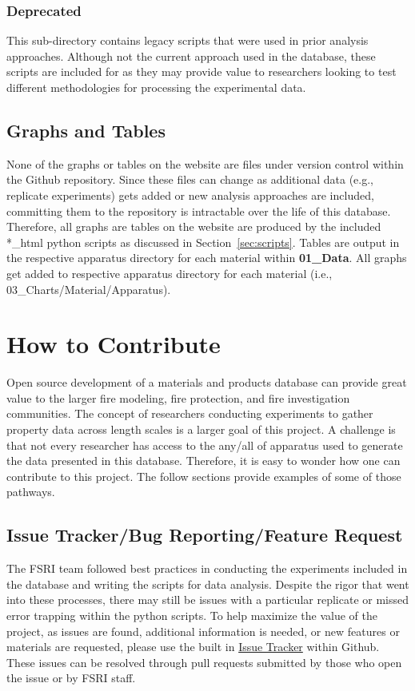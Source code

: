 \documentclass[12pt,oneside]{book}
\begin{document}
\subsection{Deprecated}
This sub-directory contains legacy scripts that were used in prior analysis approaches. Although not the current approach used in the database, these scripts are included for as they may provide value to researchers looking to test different methodologies for processing the experimental data.


\section{Graphs and Tables}
\label{sec:graphs}

None of the graphs or tables on the website are files under version control within the Github repository. Since these files can change as additional data (e.g., replicate experiments) gets added or new analysis approaches are included, committing them to the repository is intractable over the life of this database. Therefore, all graphs are tables on the website are produced by the included *\_html python scripts as discussed in Section~\ref{sec:scripts}. Tables are output in the respective apparatus directory for each material within {\bf 01\_Data}. All graphs get added to respective apparatus directory for each material (i.e., 03\_Charts/Material/Apparatus).


\chapter{How to Contribute}
\label{sec:contribute}

Open source development of a materials and products database can provide great value to the larger fire modeling, fire protection, and fire investigation communities. The concept of researchers conducting experiments to gather property data across length scales is a larger goal of this project. A challenge is that not every researcher has access to the any/all of apparatus used to generate the data presented in this database. Therefore, it is easy to wonder how one can contribute to this project. The follow sections provide examples of some of those pathways.

\section{Issue Tracker/Bug Reporting/Feature Request}
The FSRI team followed best practices in conducting the experiments included in the database and writing the scripts for data analysis. Despite the rigor that went into these processes, there may still be issues with a particular replicate or missed error trapping within the python scripts. To help maximize the value of the project, as issues are found, additional information is needed, or new features or materials are requested, please use the built in \href{https://github.com/ulfsri/fsri_materials_database/issues}{Issue Tracker} within Github. These issues can be resolved through pull requests submitted by those who open the issue or by FSRI staff.
\end{document}

